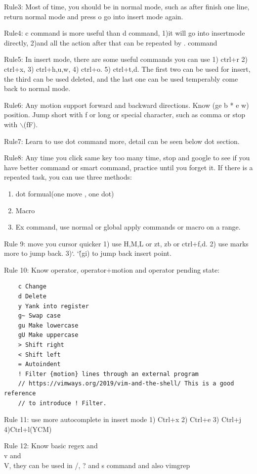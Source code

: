 \documentclass[paper=8.5in:11in, twoside, 12pt, pagesize=pdftex]{book}
\begin{document}
Rule3: Most of time, you should be in normal mode,  such as after finish one line, return normal mode and press o go into insert mode again.

Rule4: c command is more useful than d command, 1)it will go into insertmode directly, 2)and all the action after that can be repeated by . command

Rule5: In insert mode, there are some useful commands you can use 1) ctrl+r 2) ctrl+x, 3) ctrl+h,u,w, 4) ctrl+o. 5) ctrl+t,d. The first two can be used for insert, the third can be used deleted, and the last one can be used temperably come back to normal mode.

Rule6: Any motion support forward and backward directions. Know (ge b * e w) position. Jump short with f or long or special character, such as comma or stop with $\backslash$(fF).

Rule7: Learn to use dot command more, detail can be seen below dot section.

Rule8: Any time you click same key too many time, stop and google to see if you have better command or smart command, practice until you forget it. If there is a repeated task, you can use three methods:
\begin{enumerate}
	\item dot formual(one move , one dot)
	\item Macro 
	\item Ex command, use normal or global apply commands or macro on a range.
\end{enumerate}

Rule 9: move you cursor quicker 1) use H,M,L or zt, zb or ctrl+f,d. 2) use marks more to jump back. 3)`. `\^(gi) to jump back insert point.

Rule 10: Know operator, operator+motion and operator pending state:
\begin{verbatim}
	c Change
	d Delete
	y Yank into register
	g~ Swap case
	gu Make lowercase
	gU Make uppercase
	> Shift right
	< Shift left
	= Autoindent
	! Filter {motion} lines through an external program
	// https://vimways.org/2019/vim-and-the-shell/ This is a good reference 
	// to introduce ! Filter.
\end{verbatim}	
Rule 11: use more autocomplete in insert mode 1) Ctrl+x 2) Ctrl+e 3) Ctrl+j 4)Ctrl+l(YCM)

Rule 12: Know basic regex and \\v and \\V, they can be used in /, ? and s command and also vimgrep
\end{document}
